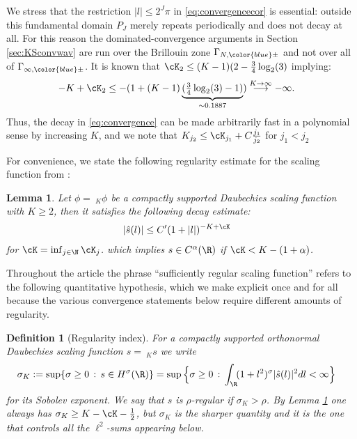 \documentclass[a4paper, 11pt]{article}
\newcommand{\ltwo}{\ell^{2}}
\DeclareMathOperator{\1}{\mathds{1}}
\newtheorem{lemma}[thm]{Lemma}
\newtheorem{defn}[thm]{Definition}
\begin{document}
We stress that the restriction $|l|\leq2^{J}\pi$ in \eqref{eq:convergencecor} is essential: outside this fundamental domain $P_{J}$ merely repeats periodically and does not decay at all. For this reason the dominated-convergence arguments in Section \ref{sec:KSconvwav} are run over the Brillouin zone $\Gamma_{N,{\color{blue}\pm}}$ and not over all of $\Gamma_{\infty,{\color{blue}\pm}}$.
It is known that $\cK_{2} \leq (K-1)(2-\tfrac{3}{4}\log_{2}(3)$ \cite{DaubechiesTenLecturesOn} implying:
\begin{align}
\label{eq:decay}
-K+\cK_{2} & \leq -(1+(K-1)\underbrace{(\tfrac{3}{4}\log_{2}(3)-1)}_{\sim 0.1887}) \stackrel{K\rightarrow\infty}{\longrightarrow} -\infty.
\end{align}
Thus, the decay in \eqref{eq:convergence} can be made arbitrarily fast in a polynomial sense by increasing $K$, and we note that $K_{j_{2}}\leq\cK_{j_{1}}+C\tfrac{j_{1}}{j_{2}}$ for $j_{1}<j_{2}$

For convenience, we state the following regularity estimate for the scaling function from \cite[Lemma 7.1.2]{DaubechiesTenLecturesOn}:
\begin{lemma}
\label{lem:decay}
Let $\phi =\!\ _{K}\phi$ be a compactly supported Daubechies scaling function with $K\geq2$, then it satisfies the following decay estimate:
\begin{align}
\label{eq:decaysf}
|\hat{s}(l)| & \leq C'(1+|l|)^{-K+\cK}
\end{align}
for $\cK = \inf_{j\in\N}\cK_{j}$. which implies $s\in C^{\alpha}(\R)$ if $\cK < K-(1+\alpha)$.
\end{lemma}

Throughout the article the phrase ``sufficiently regular scaling function'' refers to the following quantitative hypothesis, which we make explicit once and for all because the various convergence statements below require different amounts of regularity.

\begin{defn}[Regularity index]
\label{def:regularity}
For a compactly supported orthonormal Daubechies scaling function $s=\!\ _{K}s$ we write
\begin{align}
\label{eq:sobolevindex}
\sigma_{K} & := \sup\{\sigma\geq0\!\ :\!\ s\in H^{\sigma}(\R)\} = \sup\Big\{\sigma\geq0\!\ :\!\ \int_{\R}\!(1+l^{2})^{\sigma}|\hat{s}(l)|^{2}dl<\infty\Big\}
\end{align}
for its Sobolev exponent. We say that $s$ is \emph{$\rho$-regular} if $\sigma_{K}>\rho$. By Lemma \ref{lem:decay} one always has $\sigma_{K}\geq K-\cK-\tfrac{1}{2}$, but $\sigma_{K}$ is the sharper quantity and it is the one that controls all the $\ltwo$-sums appearing below.
\end{defn}
\end{document}
